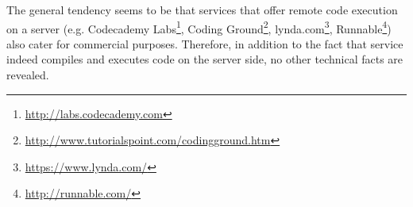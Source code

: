 The general tendency seems to be that services that offer remote code execution on a server (e.g. Codecademy Labs\footnote{ \url{http://labs.codecademy.com}}, Coding Ground\footnote{ \url{http://www.tutorialspoint.com/codingground.htm}}, lynda.com\footnote{ \url{https://www.lynda.com/}}, Runnable\footnote{ \url{http://runnable.com/}}) also cater for commercial purposes. Therefore, in addition to the fact that service indeed compiles and executes code on the server side, no other technical facts are revealed.
